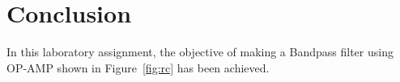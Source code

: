 \section{Conclusion}
\label{sec:conclusion}
In this laboratory assignment, the objective of making a Bandpass filter using OP-AMP shown in
Figure~\ref{fig:rc} has been achieved.





